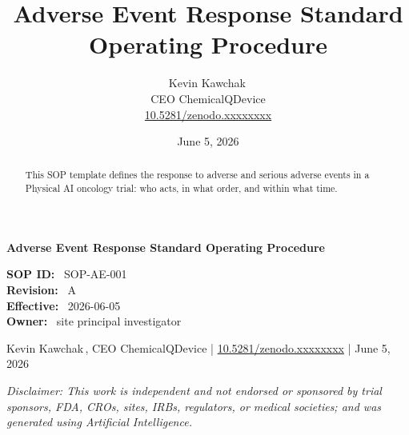 \documentclass[11pt]{article}
\title{Adverse Event Response Standard Operating Procedure}
\author{Kevin Kawchak\,\orcidicon{0009-0007-5457-8667}\\ CEO ChemicalQDevice\\ \href{https://doi.org/10.5281/zenodo.xxxxxxxx}{10.5281/zenodo.xxxxxxxx}}
\date{June 5, 2026}
\begin{document}
\thispagestyle{empty}
\noindent{\color{accentcol}\rule{\textwidth}{3pt}}\par\vspace{6pt}
{\LARGE\bfseries\sffamily\color{accentcol} Adverse Event Response Standard Operating Procedure\par}\vspace{6pt}
\noindent\footnotesize \textbf{SOP ID:}~ SOP-AE-001\\[2pt]\textbf{Revision:}~ A\\[2pt]\textbf{Effective:}~ 2026-06-05\\[2pt]\textbf{Owner:}~ site principal investigator\par\vspace{4pt}
\noindent\footnotesize Kevin Kawchak\,, CEO ChemicalQDevice \;|\; \href{https://doi.org/10.5281/zenodo.xxxxxxxx}{10.5281/zenodo.xxxxxxxx} \;|\; June 5, 2026\par
\noindent{\color{accentcol}\rule{\textwidth}{1pt}}\par\vspace{6pt}
\begin{abstract}
This SOP template defines the response to adverse and serious adverse events in a Physical AI oncology trial: who acts, in what order, and within what time.
\end{abstract}
\vspace{0.2em}\noindent\footnotesize\textit{Disclaimer: This work is independent and not endorsed or sponsored by trial sponsors, FDA, CROs, sites, IRBs, regulators, or medical societies; and was generated using Artificial Intelligence.}\normalsize\par
\keywords{}








\begingroup\raggedright\nocite{*}\endgroup
\end{document}
